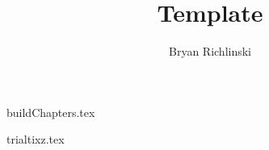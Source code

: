 \documentclass{my_class}
\title{Template}
\author{Bryan Richlinski}
\begin{document}


\maketitle
\newpage

\newpage

\nocite{*}

{buildChapters.tex}
\newpage

{trialtixz.tex}




\end{document}

